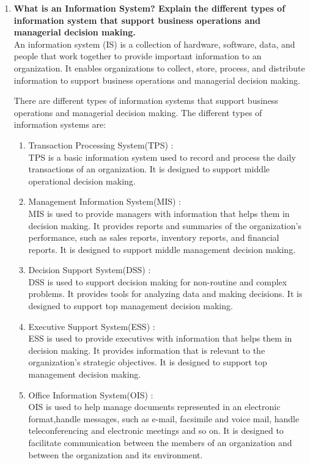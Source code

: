 \documentclass[12pt]{article}
\begin{document}
\begin{enumerate}
    \item {\bfseries What is an Information System? Explain the different types of information system that support business operations and managerial decision making.\\}
    An information system (IS) is a collection of hardware, software, data, and people that work together to provide important information to an organization. 
    It enables organizations to collect, store, process, and distribute information to support business operations and managerial decision making. 
    
    There are different types of information systems that support business operations and managerial decision making. 
    The different types of information systems are:
    \begin{enumerate}
        \item Transaction Processing System(TPS) : \\
        TPS is a basic information system used to record and process the daily transactions of an organization. It is designed to support middle operational decision making.
        \item Management Information System(MIS) :\\
        MIS is used to provide managers with information that helps them in decision making. It provides reports and summaries of the organization's performance, such as sales reports, inventory reports, and financial reports. It is designed to support middle management decision making.
        \item Decision Support System(DSS) :\\
        DSS is used to support decision making for non-routine and complex problems. It provides tools for analyzing data and making decisions. It is designed to support top management decision making.
        \item Executive Support System(ESS) :\\
        ESS is used to provide executives with information that helps them in decision making. It provides information that is relevant to the organization's strategic objectives. It is designed to support top management decision making.
        \item Office Information System(OIS) :\\
        OIS is used  to help manage documents represented in an electronic format,handle messages, such as e-mail, facsimile and voice mail, handle teleconferencing and electronic meetings and so on. It is designed to facilitate communication between the members of an organization and between the organization and its environment.
    \end{enumerate}


\end{enumerate}
\end{document}
